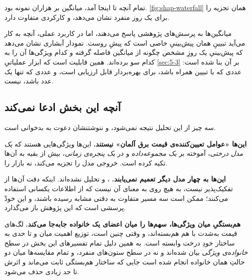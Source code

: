 تمام آنچه تا اینجا آمد، میانگین بر هزاران نمونه بود. \cref{fig:shap-waterfall}
همان تجزیه را برای یک روز منفرد نشان می‌دهد، و کارکردی متفاوت دارد.

میانگین‌ها به پرسش‌های پژوهشی پاسخ می‌دهند، اما در کاربرد عملی، آنچه به کار
می‌آید تبیینِ همان پیش‌بینیِ خاصی است که پیشِ روست. نمودار آبشاری نشان می‌دهد که
پیش‌بینیِ یک روزِ مشخص چگونه از میانگین فاصله گرفته و کدام ویژگی‌ها آن را به کدام
سو برده‌اند. همین قابلیت است که ابزار عملیاتیِ \cref{sec:5-3} بر آن بنا شده است:
عددی که با تبیین همراه باشد، برای بهره‌بردار قابل ارزیابی است، و عددی که تنها
یک عدد باشد، نیست.

\subsection*{آنچه این بخش ادعا نمی‌کند}

سه چیز از این تحلیل نتیجه نمی‌شود، و ننوشتنشان دعوت به بدخوانی است.

\textbf{این‌ها «عوامل تعیین‌کننده‌ی قیمت برق آلمان» نیستند.} این‌ها ویژگی‌هایی
هستند که \emph{یک مدل درختی}، آموخته بر \emph{یک مجموعه‌داده} و در
\emph{یک پنجره‌ی زمانی}، بیش از بقیه به آن‌ها تکیه کرده است.  خروجی مدل
را تجزیه می‌کند، نه بازار را.

\textbf{این‌ها به چهار مدل دیگر تعمیم نمی‌یابند.} ،  و
 تحلیل نشده‌اند. اینکه دقت آن‌ها از  تفکیک‌پذیر نیست، به
هیچ روی به معنای آن نیست که از اطلاعات یکسانی استفاده می‌کنند؛ ممکن است سه مسیر
متفاوت به دقتی مشابه رسیده باشند، و این خودْ پرسشی است که این پژوهش باز
می‌گذارد.

\textbf{هم‌بستگیِ میان ویژگی‌ها، سهم‌ها را میان اعضای یک خانواده جابه‌جا
می‌کند.} لگ‌های قیمت به‌شدت با هم هم‌بسته‌اند، و وقتی چنین است، توزیع اهمیت
میان  و  تا حدی به ساختار خودِ درخت وابسته است.
به همین دلیل تمام تفسیرهای این بخش در سطح \emph{خانواده‌ی ویژگی} بیان شده‌اند و
نه در سطح ستون‌های منفرد، و تمام مقایسه‌ها میان دو حالتِ همان خانواده انجام شده
است  جایی که ساختار هم‌بستگی ثابت می‌ماند و اثرش تا حد زیادی حذف می‌شود.
